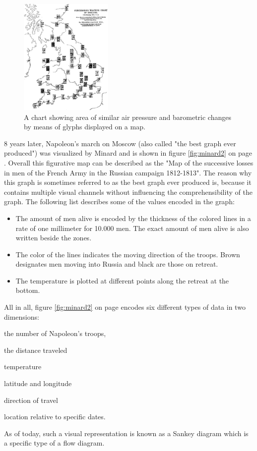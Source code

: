 \begin{figure}[!htb]
\centering
\includegraphics[width=0.4\textwidth,keepaspectratio]{images/history/weather.jpg}
\caption[
    A chart showing area of similar air pressure and barometric changes by means of glyphs displayed on a map., Urldate: 07.2016 \newline
\small\texttt{\url{http://datavis.ca/milestones//admin/uploads/images/galton-weather-charts2.gif}}
]{A chart showing area of similar air pressure and barometric changes by means of glyphs displayed on a map.}
\label{fig:weather-map}
\end{figure}

8 years later, Napoleon's march on Moscow (also called "the best graph ever produced") was visualized by Minard and is shown in figure \ref{fig:minard2} on page \pageref{fig:minard2}. Overall this figurative map can be described as the "Map of the successive losses in men of the French Army in the Russian campaign 1812-1813". The reason why this graph is sometimes referred to as the best graph ever produced is, because it contains multiple visual channels without influencing the comprehensibility of the graph. The following list describes some of the values encoded in the graph:
\begin{itemize}
\item The amount of men alive is encoded by the thickness of the colored lines in a rate of one millimeter for 10.000 men. The exact amount of men alive is also written beside the zones.
\item The color of the lines indicates the moving direction of the troops. Brown designates men moving into Russia and black are those on retreat.
\item The temperature is plotted at different points along the retreat at the bottom.
\end{itemize}
All in all, figure \ref{fig:minard2} on page \pageref{fig:minard2} encodes six different types of data in two dimensions:
\begin{enumerate*}
\item the number of Napoleon's troops,
\item the distance traveled
\item temperature
\item latitude and longitude
\item direction of travel
\item location relative to specific dates.
\end{enumerate*}
As of today, such a visual representation is known as a Sankey diagram which is a specific type of a flow diagram.

